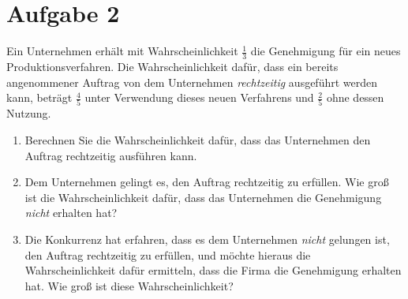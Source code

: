 \documentclass{exercise}
\begin{document}
    \section*{Aufgabe 2}

    \begin{problem}
        Ein Unternehmen erhält mit Wahrscheinlichkeit \(\frac{1}{3}\) die Genehmigung für ein neues Produktionsverfahren.
        Die Wahrscheinlichkeit dafür, dass ein bereits angenommener Auftrag von dem Unternehmen \emph{rechtzeitig} ausgeführt werden kann, beträgt \(\frac{4}{5}\) unter Verwendung dieses neuen Verfahrens und \(\frac{2}{5}\) ohne dessen Nutzung.
        \begin{enumerate}
            \item Berechnen Sie die Wahrscheinlichkeit dafür, dass das Unternehmen den Auftrag rechtzeitig ausführen kann.
            \item Dem Unternehmen gelingt es, den Auftrag rechtzeitig zu erfüllen.
            Wie groß ist die Wahrscheinlichkeit dafür, dass das Unternehmen die Genehmigung \emph{nicht} erhalten hat?
            \item Die Konkurrenz hat erfahren, dass es dem Unternehmen \emph{nicht} gelungen ist, den Auftrag rechtzeitig zu erfüllen, und möchte hieraus die Wahrscheinlichkeit dafür ermitteln, dass die Firma die Genehmigung erhalten hat.
            Wie groß ist diese Wahrscheinlichkeit?
        \end{enumerate}
    \end{problem}
\end{document}

